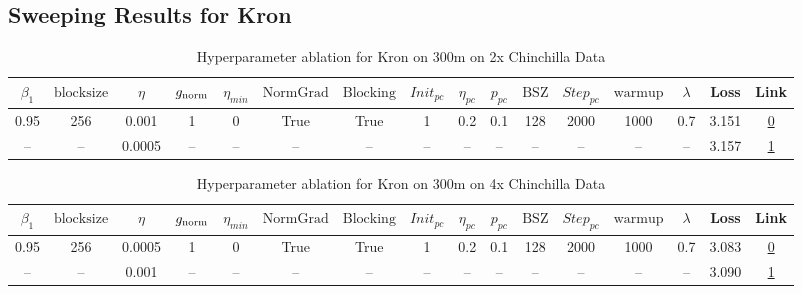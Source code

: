 \subsection{Sweeping Results for Kron}%
\begin{table}[H]
\centering
\caption{Hyperparameter ablation for Kron on 300m on 2x Chinchilla Data}
\label{tab:ablation_kron_300m_on_2x_chinchilla_data}
\begin{tabular}{cccccccccccccccc}
\toprule
$\beta_1$ & $\mathrm{block size}$ & $\eta$ & $g_{\mathrm{norm}}$ & $\eta_{min}$ & $\mathrm{NormGrad}$ & $\mathrm{Blocking}$ & $Init_{pc}$ & $\eta_{pc}$ & $p_{pc}$ & $\mathrm{BSZ}$ & $Step_{pc}$ & $\mathrm{warmup}$ & $\lambda$ & Loss & Link \\
\midrule
0.95 & 256 & 0.001 & 1 & 0 & True & True & 1 & 0.2 & 0.1 & 128 & 2000 & 1000 & 0.7 & 3.151 & \href{https://wandb.ai/marin-community/optimizer-scaling/runs/sweep-300m-12B-kronb21812lr0.001-wd0.7-b10.95-plr0.2-pis1-gn1-no-48c292}{0} \\
\midrule
-- & -- & 0.0005 & -- & -- & -- & -- & -- & -- & -- & -- & -- & -- & -- & 3.157 & \href{https://wandb.ai/marin-community/optimizer-scaling/runs/sweep-300m-12B-kron7436a9lr0.0005-wd0.7-b10.95-plr0.2-pis1-gn1-n-68efd2}{1} \\
\bottomrule
\end{tabular}
\end{table}

\begin{table}[H]
\centering
\caption{Hyperparameter ablation for Kron on 300m on 4x Chinchilla Data}
\label{tab:ablation_kron_300m_on_4x_chinchilla_data}
\begin{tabular}{cccccccccccccccc}
\toprule
$\beta_1$ & $\mathrm{block size}$ & $\eta$ & $g_{\mathrm{norm}}$ & $\eta_{min}$ & $\mathrm{NormGrad}$ & $\mathrm{Blocking}$ & $Init_{pc}$ & $\eta_{pc}$ & $p_{pc}$ & $\mathrm{BSZ}$ & $Step_{pc}$ & $\mathrm{warmup}$ & $\lambda$ & Loss & Link \\
\midrule
0.95 & 256 & 0.0005 & 1 & 0 & True & True & 1 & 0.2 & 0.1 & 128 & 2000 & 1000 & 0.7 & 3.083 & \href{https://wandb.ai/marin-community/optimizer-scaling/runs/sweep-300m-24B-kronb55572lr0.0005-wd0.7-b10.95-plr0.2-pis1-gn1-n-9479df}{0} \\
\midrule
-- & -- & 0.001 & -- & -- & -- & -- & -- & -- & -- & -- & -- & -- & -- & 3.090 & \href{https://wandb.ai/marin-community/optimizer-scaling/runs/sweep-300m-24B-kron7aa525lr0.001-wd0.7-b10.95-plr0.2-pis1-gn1-no-127f30}{1} \\
\bottomrule
\end{tabular}
\end{table}

